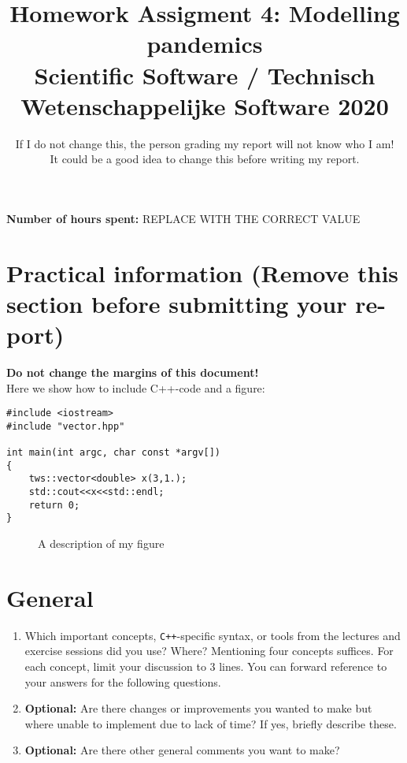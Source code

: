 \documentclass[a4paper]{article}
\title{Homework Assigment 4: Modelling pandemics \\ \large Scientific Software / Technisch Wetenschappelijke Software 2020}
\author{If I do not change this, the person grading my report will not know who I am!\\ It could be a good idea to change this before writing my report.}
\newcommand{\answer}[1]{\vspace{-0.75em}\begin{framed} #1 \end{framed}\vspace{-0.75em}}
\begin{document}
\maketitle
\noindent \textbf{Number of hours spent:} REPLACE WITH THE CORRECT VALUE
\section*{Practical information (Remove this section before submitting your re-
port)}
\textbf{Do not change the margins of this document!}\\


Here we show how to include C++-code and a figure:
\begin{lstlisting}
#include <iostream>
#include "vector.hpp"

int main(int argc, char const *argv[])
{
	tws::vector<double> x(3,1.);
	std::cout<<x<<std::endl;
	return 0;
}   
\end{lstlisting}

\begin{figure}[!h]
	\centering
	\caption{A description of my figure}
\end{figure}
\section*{General}
\begin{enumerate}[label={(G.\arabic*)}]
	\item Which important concepts, \verb|C++|-specific syntax, or tools from the lectures and exercise
sessions did you use? Where? Mentioning four concepts suffices. For each concept, limit
your discussion to 3 lines. You can forward reference to your answers for the following
questions.
	\answer{}
	\item \textbf{Optional:} Are there changes or improvements you wanted to make but where unable to
implement due to lack of time? If yes, briefly describe these.
	\answer{}
	\item \textbf{Optional:} Are there other general comments you want to make?
	\answer{}
\end{enumerate}
\end{document}
